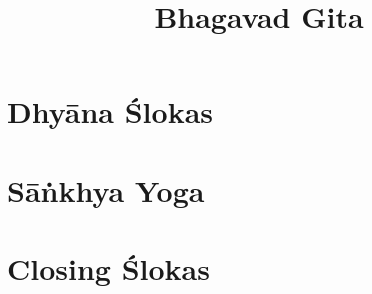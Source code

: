 \documentclass{scrbook}
\title{Bhagavad Gita}
\date{}
\begin{document}
\maketitle
\frontmatter

\tableofcontents
\newpage

\chapter{Dhyāna Ślokas}


\mainmatter

\chapter{Sāṅkhya Yoga}


\backmatter
\chapter{Closing Ślokas}

\end{document}
